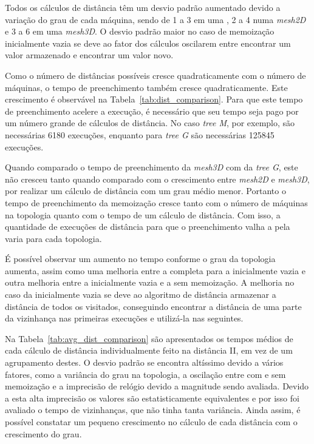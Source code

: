 Todos os cálculos de distância têm um desvio padrão aumentado devido a variação do grau de cada máquina, sendo de 1 a 3 em uma \fatt, 2 a 4 numa \textit{mesh2D} e 3 a 6 em uma \textit{mesh3D}.
O desvio padrão maior no caso de memoização inicialmente vazia se deve ao fator dos cálculos oscilarem entre encontrar um valor armazenado e encontrar um valor novo.

Como o número de distâncias possíveis cresce quadraticamente com o número de máquinas, o tempo de preenchimento também cresce quadraticamente. Este crescimento é observável na Tabela~\ref{tab:dist_comparison}. 
Para que este tempo de preenchimento acelere a execução, é necessário que seu tempo seja pago por um número grande de cálculos de distância. 
No caso \textit{tree M}, por exemplo, são necessárias 6180 execuções, enquanto para \textit{tree G} são necessárias 125845 execuções.


Quando comparado o tempo de preenchimento da \textit{mesh3D} com da \textit{tree G}, este não cresceu tanto quando comparado com o crescimento entre \textit{mesh2D} e \textit{mesh3D}, por realizar um cálculo de distância com um grau médio menor.
Portanto o tempo de preenchimento da memoização cresce tanto com o número de máquinas na topologia quanto com o tempo de um cálculo de distância.
Com isso, a quantidade de execuções de distância para que o preenchimento valha a pela varia para cada topologia.

É possível observar um aumento no tempo conforme o grau da topologia aumenta, assim como uma melhoria entre a completa para a inicialmente vazia e outra melhoria entre a inicialmente vazia e a sem memoização.
A  melhoria no caso da inicialmente vazia se deve ao algoritmo de distância armazenar a distância de todos os visitados, conseguindo encontrar a distância de uma parte da vizinhança nas primeiras execuções e utilizá-la nas seguintes.

Na Tabela~\ref{tab:avg_dist_comparison} são apresentados os tempos médios de cada cálculo de distância individualmente feito na distância II, em vez de um agrupamento destes.
O desvio padrão se encontra altíssimo devido a vários fatores, como a variância do grau na topologia, a oscilação entre com e sem memoização e a imprecisão de relógio devido a magnitude sendo avaliada.
Devido a esta alta imprecisão os valores são estatisticamente equivalentes e por isso foi avaliado o tempo de vizinhanças, que não tinha tanta variância.
Ainda assim, é possível constatar um pequeno crescimento no cálculo de cada distância com o crescimento do grau.

